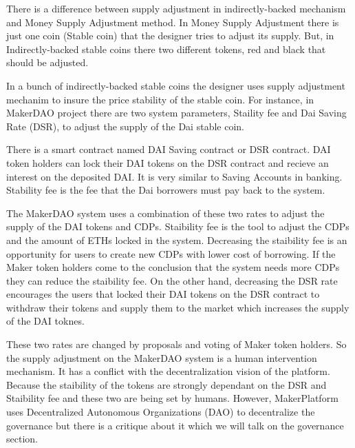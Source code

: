There is a difference between supply adjustment in indirectly-backed mechanism and Money Supply Adjustment method. In Money Supply Adjustment there is just one coin (Stable coin) that the designer tries to adjust its supply. But, in Indirectly-backed stable coins there two different tokens, red and black that should be adjusted.

In a bunch of indirectly-backed stable coins the designer uses supply adjustment mechanim to insure the price stability of the stable coin. For instance, in MakerDAO project there are two system parameters, Staility fee and Dai Saving Rate (DSR), to adjust the supply of the Dai stable coin.

There is a smart contract named DAI Saving contract or DSR contract. DAI token holders can lock their DAI tokens on the DSR contract and recieve an interest on the deposited DAI. It is very similar to Saving Accounts in banking. 
Stability fee is the fee that the Dai borrowers must pay back to the system. 

The MakerDAO system uses a combination of these two rates to adjust the supply of the DAI tokens and CDPs. Staibility fee is the tool to adjust the CDPs and the amount of ETHs locked in the system. Decreasing the staibility fee is an opportunity for users to create new CDPs with lower cost of borrowing. If the Maker token holders come to the conclusion that the system needs more CDPs they can reduce the staibility fee.
On the other hand, decreasing the DSR rate encourages the users that locked their DAI tokens on the DSR contract to withdraw their tokens and supply them to the market which increases the supply of the DAI toknes.

These two rates are changed by proposals and voting of Maker token holders. So the supply adjustment on the MakerDAO system is a human intervention mechanism. It has a conflict with the decentralization vision of the platform. Because the staibility of the tokens are strongly dependant on the DSR and Staibility fee and these two are being set by humans. However, MakerPlatform uses Decentralized Autonomous Organizations (DAO) to decentralize the governance but there is a critique about it which we will talk on the governance section.

